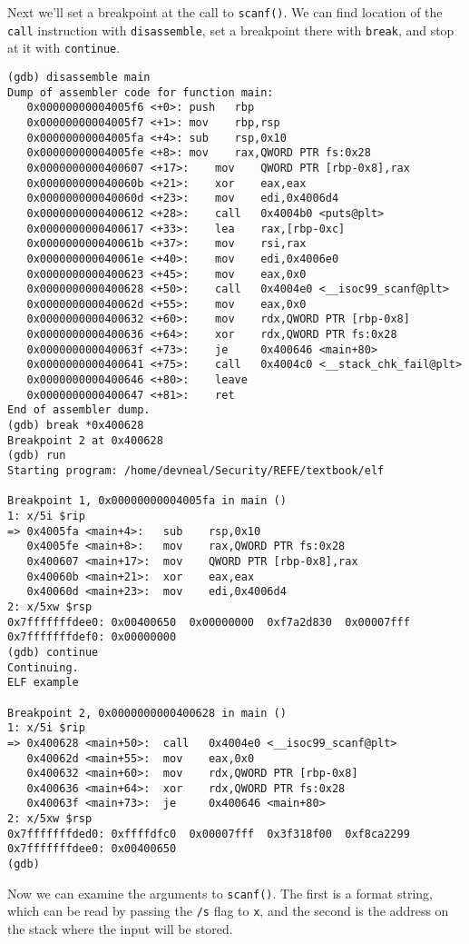 \documentclass{article}
\begin{document}
Next we'll set a breakpoint at the call to \texttt{scanf()}. We can find
location of the \texttt{call} instruction with \texttt{disassemble}, set a
breakpoint there with \texttt{break}, and stop at it with \texttt{continue}.

\begin{lstlisting}
(gdb) disassemble main
Dump of assembler code for function main:
   0x00000000004005f6 <+0>:	push   rbp
   0x00000000004005f7 <+1>:	mov    rbp,rsp
   0x00000000004005fa <+4>:	sub    rsp,0x10
   0x00000000004005fe <+8>:	mov    rax,QWORD PTR fs:0x28
   0x0000000000400607 <+17>:	mov    QWORD PTR [rbp-0x8],rax
   0x000000000040060b <+21>:	xor    eax,eax
   0x000000000040060d <+23>:	mov    edi,0x4006d4
   0x0000000000400612 <+28>:	call   0x4004b0 <puts@plt>
   0x0000000000400617 <+33>:	lea    rax,[rbp-0xc]
   0x000000000040061b <+37>:	mov    rsi,rax
   0x000000000040061e <+40>:	mov    edi,0x4006e0
   0x0000000000400623 <+45>:	mov    eax,0x0
   0x0000000000400628 <+50>:	call   0x4004e0 <__isoc99_scanf@plt>
   0x000000000040062d <+55>:	mov    eax,0x0
   0x0000000000400632 <+60>:	mov    rdx,QWORD PTR [rbp-0x8]
   0x0000000000400636 <+64>:	xor    rdx,QWORD PTR fs:0x28
   0x000000000040063f <+73>:	je     0x400646 <main+80>
   0x0000000000400641 <+75>:	call   0x4004c0 <__stack_chk_fail@plt>
   0x0000000000400646 <+80>:	leave  
   0x0000000000400647 <+81>:	ret    
End of assembler dump.
(gdb) break *0x400628
Breakpoint 2 at 0x400628
(gdb) run
Starting program: /home/devneal/Security/REFE/textbook/elf 

Breakpoint 1, 0x00000000004005fa in main ()
1: x/5i $rip
=> 0x4005fa <main+4>:	sub    rsp,0x10
   0x4005fe <main+8>:	mov    rax,QWORD PTR fs:0x28
   0x400607 <main+17>:	mov    QWORD PTR [rbp-0x8],rax
   0x40060b <main+21>:	xor    eax,eax
   0x40060d <main+23>:	mov    edi,0x4006d4
2: x/5xw $rsp
0x7fffffffdee0:	0x00400650	0x00000000	0xf7a2d830	0x00007fff
0x7fffffffdef0:	0x00000000
(gdb) continue 
Continuing.
ELF example

Breakpoint 2, 0x0000000000400628 in main ()
1: x/5i $rip
=> 0x400628 <main+50>:	call   0x4004e0 <__isoc99_scanf@plt>
   0x40062d <main+55>:	mov    eax,0x0
   0x400632 <main+60>:	mov    rdx,QWORD PTR [rbp-0x8]
   0x400636 <main+64>:	xor    rdx,QWORD PTR fs:0x28
   0x40063f <main+73>:	je     0x400646 <main+80>
2: x/5xw $rsp
0x7fffffffded0:	0xffffdfc0	0x00007fff	0x3f318f00	0xf8ca2299
0x7fffffffdee0:	0x00400650
(gdb) 
\end{lstlisting}

Now we can examine the arguments to \texttt{scanf()}. The first is a format
string, which can be read by passing the \texttt{/s} flag to \texttt{x}, and the
second is the address on the stack where the input will be stored.
\end{document}
